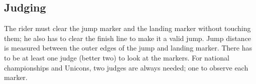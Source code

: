 \subsection{Judging}
The rider must clear the jump marker and the landing marker without touching them; he also has to clear the finish line to make it a valid jump.
Jump distance is measured between the outer edges of the jump and landing marker.
There has to be at least one judge (better two) to look at the markers.
For national championships and Unicons, two judges are always needed; one to observe each marker.
